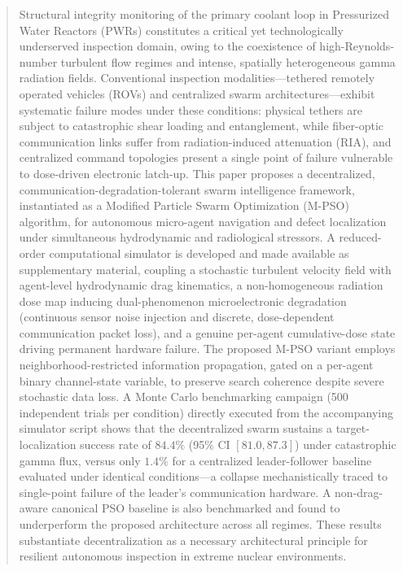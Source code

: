 \documentclass[journal]{IEEEtran}
\begin{document}
\begin{abstract}
Structural integrity monitoring of the primary coolant loop in Pressurized Water Reactors (PWRs) constitutes a critical yet technologically underserved inspection domain, owing to the coexistence of high-Reynolds-number turbulent flow regimes and intense, spatially heterogeneous gamma radiation fields. Conventional inspection modalities---tethered remotely operated vehicles (ROVs) and centralized swarm architectures---exhibit systematic failure modes under these conditions: physical tethers are subject to catastrophic shear loading and entanglement, while fiber-optic communication links suffer from radiation-induced attenuation (RIA), and centralized command topologies present a single point of failure vulnerable to dose-driven electronic latch-up. This paper proposes a decentralized, communication-degradation-tolerant swarm intelligence framework, instantiated as a Modified Particle Swarm Optimization (M-PSO) algorithm, for autonomous micro-agent navigation and defect localization under simultaneous hydrodynamic and radiological stressors. A reduced-order computational simulator is developed and made available as supplementary material, coupling a stochastic turbulent velocity field with agent-level hydrodynamic drag kinematics, a non-homogeneous radiation dose map inducing dual-phenomenon microelectronic degradation (continuous sensor noise injection and discrete, dose-dependent communication packet loss), and a genuine per-agent cumulative-dose state driving permanent hardware failure. The proposed M-PSO variant employs neighborhood-restricted information propagation, gated on a per-agent binary channel-state variable, to preserve search coherence despite severe stochastic data loss. A Monte Carlo benchmarking campaign (500 independent trials per condition) directly executed from the accompanying simulator script shows that the decentralized swarm sustains a target-localization success rate of $84.4\%$ (95\% CI $[81.0, 87.3]$) under catastrophic gamma flux, versus only $1.4\%$ for a centralized leader-follower baseline evaluated under identical conditions---a collapse mechanistically traced to single-point failure of the leader's communication hardware. A non-drag-aware canonical PSO baseline is also benchmarked and found to underperform the proposed architecture across all regimes. These results substantiate decentralization as a necessary architectural principle for resilient autonomous inspection in extreme nuclear environments.
\end{abstract}
\end{document}
